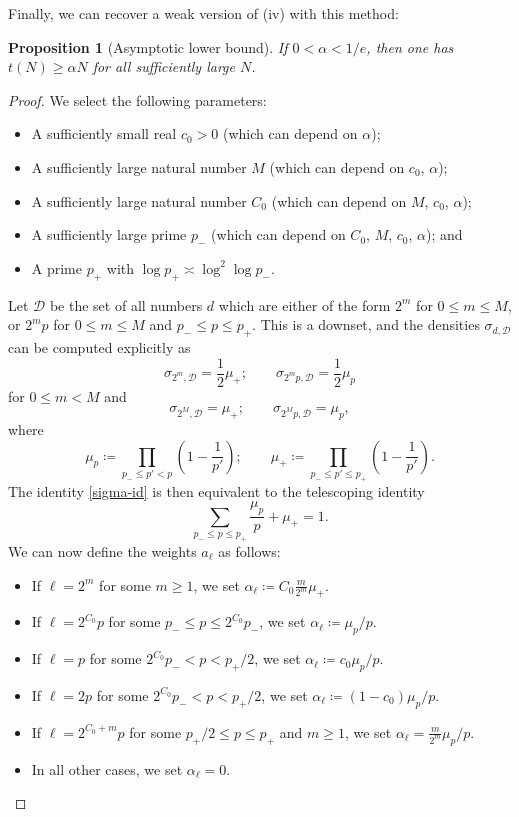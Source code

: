 \documentclass[10pt,a4paper,reqno]{amsart}
\numberwithin{equation}{section}
\theoremstyle{plain}
\newtheorem{proposition}[proposition]{Proposition}
\theoremstyle{definition}
\begin{document}
Finally, we can recover a weak version of (iv) with this method:

\begin{proposition}[Asymptotic lower bound]\label{asymp}  If $0 < \alpha < 1/e$, then one has $t(N) \geq \alpha N$ for all sufficiently large $N$.
\end{proposition}

\begin{proof}  We select the following parameters:
  \begin{itemize}
  \item A sufficiently small real $c_0>0$ (which can depend on $\alpha$);
  \item A sufficiently large natural number $M$ (which can depend on $c_0$, $\alpha$);
  \item A sufficiently large natural number $C_0$ (which can depend on $M$, $c_0$, $\alpha$);
  \item A sufficiently large prime $p_-$ (which can depend on $C_0$, $M$, $c_0$, $\alpha$); and
  \item A prime $p_+$ with $\log p_+ \asymp \log^2 \log p_-$.
  \end{itemize}
Let ${\mathcal D}$ be the set of all numbers $d$ which are either of the form $2^m$ for $0 \leq m \leq M$, or $2^m p$ for $0 \leq m \leq M$ and $p_- \leq p \leq p_+$.  This is a downset, and the densities $\sigma_{d,{\mathcal D}}$ can be computed explicitly as
$$ \sigma_{2^m,{\mathcal D}} = \frac{1}{2} \mu_+; \qquad \sigma_{2^m p,{\mathcal D}} = \frac{1}{2} \mu_p$$
for $0 \leq m < M$ and
$$ \sigma_{2^M,{\mathcal D}} = \mu_+; \qquad \sigma_{2^M p,{\mathcal D}} = \mu_p,$$
where
$$ \mu_p \coloneqq \prod_{p_- \leq p' < p} \left( 1 - \frac{1}{p'} \right); \qquad \mu_+ \coloneqq \prod_{p_- \leq p' \leq p_+} \left( 1 - \frac{1}{p'} \right).$$
The identity \eqref{sigma-id} is then equivalent to the telescoping identity
\begin{equation}\label{telescope}
   \sum_{p_- \leq p \leq p_+} \frac{\mu_p}{p} + \mu_+ = 1.
\end{equation}
We can now define the weights $a_\ell$ as follows:
\begin{itemize}
\item[(i)] If $\ell = 2^m$ for some $m \geq 1$, we set $\alpha_\ell \coloneqq C_0 \frac{m}{2^m} \mu_+$.
\item[(ii)] If $\ell = 2^{C_0} p$ for some $p_- \leq p \leq 2^{C_0} p_-$, we set $\alpha_\ell \coloneqq \mu_p/p$.
\item[(iii)] If $\ell = p$ for some $2^{C_0} p_- < p < p_+/2$, we set $\alpha_\ell \coloneqq c_0 \mu_p/p$.
\item[(iv)] If $\ell = 2p$ for some $2^{C_0} p_- < p < p_+/2$, we set $\alpha_\ell \coloneqq (1-c_0) \mu_p/p$.
\item[(v)] If $\ell = 2^{C_0+m} p$ for some $p_+/2 \leq p \leq p_+$ and $m \geq 1$, we set $\alpha_\ell = \frac{m}{2^m} \mu_p/p$.
\item[(vi)] In all other cases, we set $\alpha_\ell = 0$.
\end{itemize}


\end{proof}
\end{document}
